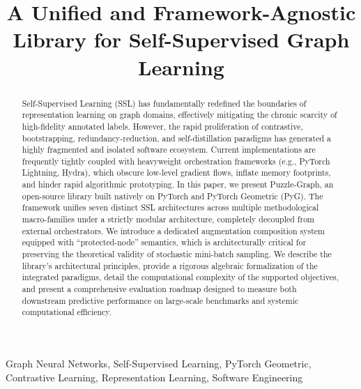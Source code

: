 \documentclass[conference]{IEEEtran}
\begin{document}
\title{A Unified and Framework-Agnostic Library for Self-Supervised Graph Learning
}

\author{
}

\maketitle

\begin{abstract}
Self-Supervised Learning (SSL) has fundamentally redefined the boundaries of representation learning on graph domains, effectively mitigating the chronic scarcity of high-fidelity annotated labels. However, the rapid proliferation of contrastive, bootstrapping, redundancy-reduction, and self-distillation paradigms has generated a highly fragmented and isolated software ecosystem. Current implementations are frequently tightly coupled with heavyweight orchestration frameworks (e.g., PyTorch Lightning, Hydra), which obscure low-level gradient flows, inflate memory footprints, and hinder rapid algorithmic prototyping. In this paper, we present Puzzle-Graph, an open-source library built natively on PyTorch and PyTorch Geometric (PyG). The framework unifies seven distinct SSL architectures across multiple methodological macro-families under a strictly modular architecture, completely decoupled from external orchestrators. We introduce a dedicated augmentation composition system equipped with ``protected-node'' semantics, which is architecturally critical for preserving the theoretical validity of stochastic mini-batch sampling. We describe the library's architectural principles, provide a rigorous algebraic formalization of the integrated paradigms, detail the computational complexity of the supported objectives, and present a comprehensive evaluation roadmap designed to measure both downstream predictive performance on large-scale benchmarks and systemic computational efficiency.
\end{abstract}

\begin{IEEEkeywords}
Graph Neural Networks, Self-Supervised Learning, PyTorch Geometric, Contrastive Learning, Representation Learning, Software Engineering
\end{IEEEkeywords}
\end{document}
